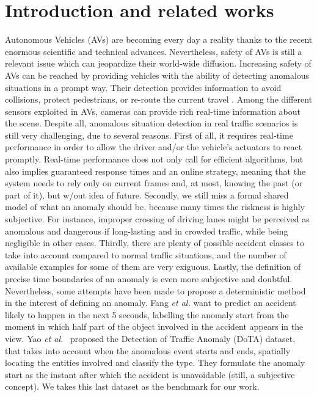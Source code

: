 \section{Introduction and related works}

Autonomous Vehicles (AVs) are becoming every day a reality thanks to the recent enormous scientific and technical advances.
Nevertheless, safety of AVs is still a relevant issue which can jeopardize their world-wide diffusion.
Increasing safety of AVs can be reached by providing vehicles with the ability of detecting anomalous situations in a prompt way.
Their detection provides information to avoid collisions, protect pedestrians, or re-route the current travel \cite{4298901}.
Among the different sensors exploited in AVs, cameras can provide rich real-time information about the scene.
Despite all, anomalous situation detection in real traffic scenarios is still very challenging, due to several reasons.
First of all, it requires real-time performance in order to allow the driver and/or the vehicle's actuators to react promptly.
Real-time performance does not only call for efficient algorithms, but also implies guaranteed response times and an online strategy, meaning that the system needs to rely only on current frames and, at most, knowing the past (or part of it), but w/out idea of future.
Secondly, we still miss a formal shared model of what an anomaly should be, because many times the riskness is highly subjective.
For instance, improper crossing of driving lanes might be perceived as anomalous and dangerous if long-lasting and in crowded traffic, while being negligible in other cases.
Thirdly, there are plenty of possible accident classes to take into account compared to normal traffic situations, and the number of available examples for some of them are very exiguous.
Lastly, the definition of precise time boundaries of an anomaly is even more subjective and doubtful.
Nevertheless, some attempts have been made to propose a deterministic method in the interest of defining an anomaly.
Fang \emph{et al.} \cite{fang2019dada} want to predict an accident likely to happen in the next 5 seconds, labelling the anomaly start from the moment in which half part of the object involved in the accident appears in the view.
Yao \emph{et al.}~\cite{9712446} proposed the Detection of Traffic Anomaly (DoTA) dataset, that takes into account when the anomalous event starts and ends, spatially locating the entities involved and classify the type.
They formulate the anomaly start as the instant after which the accident is unavoidable (still, a subjective concept).
We takes this last dataset as the benchmark for our work.

